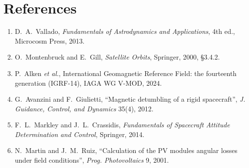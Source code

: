 \documentclass[11pt,a4paper]{article}
\begin{document}
\section*{References}
\begin{enumerate}
\item D.~A.~Vallado, \emph{Fundamentals of Astrodynamics and Applications}, 4th ed., Microcosm Press, 2013.
\item O.~Montenbruck and E.~Gill, \emph{Satellite Orbits}, Springer, 2000, \S3.4.2.
\item P.~Alken \emph{et al.}, International Geomagnetic Reference Field: the fourteenth generation (IGRF-14), IAGA WG V-MOD, 2024.
\item G.~Avanzini and F.~Giulietti, ``Magnetic detumbling of a rigid spacecraft'', \emph{J. Guidance, Control, and Dynamics} 35(4), 2012.
\item F.~L.~Markley and J.~L.~Crassidis, \emph{Fundamentals of Spacecraft Attitude Determination and Control}, Springer, 2014.
\item N.~Martin and J.~M.~Ruiz, ``Calculation of the PV modules angular losses under field conditions'', \emph{Prog. Photovoltaics} 9, 2001.
\end{enumerate}
\end{document}
